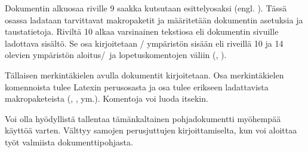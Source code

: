 Dokumentin alkuosaa riville 9 saakka kutsutaan esittelyosaksi (engl.
). Tässä osassa ladataan tarvittavat makropaketit ja
määritetään dokumentin asetuksia ja taustatietoja. Riviltä 10 alkaa
varsinainen tekstiosa eli dokumentin sivuille ladottava sisältö. Se osa
kirjoitetaan \-/ ympäristön sisään eli riveillä 10
ja 14 olevien ympäristön aloitus\-/\ ja lopetuskomentojen väliin
(, ).

Tällaisen merkintäkielen avulla dokumentit kirjoitetaan. Osa
merkintäkielen komennoista tulee Latexin perusosasta ja osa tulee
erikseen ladattavista makropaketeista (,
,  ym.). Komentoja voi luoda
itsekin.

Voi olla hyödyllistä tallentaa tämänkaltainen pohjadokumentti myöhempää
käyttöä varten. Välttyy samojen perusjuttujen kirjoittamiselta, kun voi
aloittaa työt valmiista dokumenttipohjasta.
